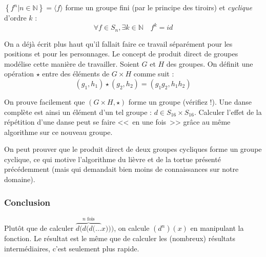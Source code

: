 \documentclass[11pt,a4paper,oneside]{book}
\begin{document}

$\left\{f^n|n \in \mathbb{N}\right\}=\langle f\rangle$ forme un groupe fini
(par le principe des tiroirs) et \emph{cyclique} d'ordre $k$ : \[
	\forall f\in S_n, \exists k\in \mathbb{N} \quad f^k=id
\]

On a déjà écrit plus haut qu'il fallait faire ce travail séparément pour les
positions et pour les personnages. Le concept de produit direct de groupes
modélise cette manière de travailler. Soient $G$ et $H$ des groupes. On définit
une opération $\star$ entre des éléments de $G\times H$ comme suit : \[
	(g_1, h_1) \star (g_2, h_2) = (g_1g_2, h_1h_2)
\]

On prouve facilement que $(G\times H, \star)$ forme un groupe (vérifiez !).
Une danse complète est ainsi un élément d'un tel groupe :
$d\in S_{16}\times S_{16}$.
Calculer l'effet de la répétition d'une danse peut se faire <<~en une fois~>>
grâce au même algorithme sur ce nouveau groupe.

On peut prouver que le produit direct de deux groupes cycliques forme un groupe
cyclique, ce qui motive l'algorithme du lièvre et de la tortue présenté
précédemment (mais qui demandait bien moins de connaissances sur notre domaine).


\subsubsection{Conclusion}
Plutôt que de calculer $\overbrace{d(d(d(\dots}^\text{$n$ fois} x)))$,
on calcule $\left(d^n\right)(x)$ en manipulant la fonction. Le résultat est le
même que de calculer les (nombreux) résultats intermédiaires, c'est seulement
plus rapide.
\end{document}

